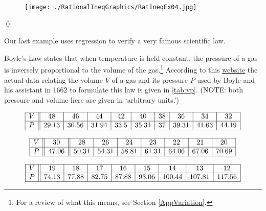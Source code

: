 \begin{ex}
\begin{enumerate}
\begin{figure}
\begin{center}

\texttt{[image: ./RationalIneqGraphics/RatIneqEx04.jpg]} 

\caption{}
\label{fig:graphboxprob}
\end{center} 
\end{figure}

\end{enumerate}
\qed

\end{ex}

Our last example uses regression to verify a very famous scientific law.

\begin{ex}  \label{BoyleslawRational} Boyle's Law states that when temperature is held constant, the pressure of a gas is inversely proportional to the volume of the gas.\footnote{For a review of what this means, see Section \ref{AppVariation}.}  According to this \href{http://web.lemoyne.edu/~giunta/classicalcs/boyleverify.html}{\underline{website}} the actual data relating the volume $V$ of a gas and its pressure $P$ used by Boyle and his assistant in 1662 to formulate this law is given in \autoref{tab:vp}. (NOTE: both pressure and volume here are given in `arbitrary units.')

\begin{table}

\small
\[ \begin{array}{|c||c|c|c|c|c|c|c|c|c|}  \hline
V & 48 & 46 & 44 & 42 & 40 & 38 & 36 & 34 & 32   \\ \hline
P & 29.13 & 30.56 & 31.94 & 33.5 & 35.31 & 37 & 39.31 & 41.63 & 44.19  \\ \hline
\end{array} \]

\[ \begin{array}{|c||c||c|c|c|c|c|c|c|c|c|c|c|c|c|c|c|c|} \hline
V & 30 & 28 & 26 & 24 & 23 & 22 & 21 & 20  \\ \hline 
P& 47.06 & 50.31 & 54.31 & 58.81  & 61.31 & 64.06 & 67.06 & 70.69   \\ \hline
\end{array} \]

\[ \begin{array}{|c||c|c|c|c|c|c|c|c|c|}  \hline
V & 19 & 18 & 17 & 16 & 15 & 14 & 13 & 12\\ \hline
P & 74.13 & 77.88 & 82.75 & 87.88 & 93.06 & 100.44 & 107.81 & 117.56\\ \hline
\end{array} \]
\normalsize


\end{table}
\end{ex}
